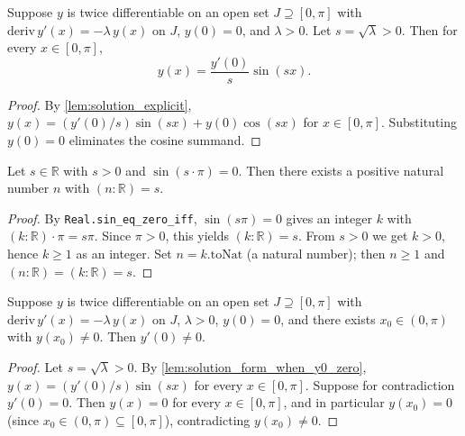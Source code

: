 \begin{lemma}[Solution form when $y(0) = 0$, $\lambda > 0$]
    \label{lem:solution_form_when_y0_zero}
    \leanok
    Suppose $y$ is twice differentiable on an open set $J \supseteq [0,\pi]$
    with $\mathrm{deriv}\, y'(x) = -\lambda \, y(x)$ on $J$, $y(0) = 0$, and
    $\lambda > 0$. Let $s = \sqrt{\lambda} > 0$. Then for every
    $x \in [0,\pi]$,
    \[ y(x) = \frac{y'(0)}{s} \sin(sx). \]
\end{lemma}
\begin{proof}
    By \cref{lem:solution_explicit}, $y(x) = (y'(0)/s)\sin(sx) + y(0)\cos(sx)$
    for $x \in [0,\pi]$. Substituting $y(0) = 0$ eliminates the cosine summand.
\end{proof}

\begin{lemma}[$s > 0$ and $\sin(s\pi) = 0$ force $s$ to be a positive natural]
    \label{lem:sin_pi_smul_eq_zero_pos_to_nat}
    \leanok
    Let $s \in \mathbb{R}$ with $s > 0$ and $\sin(s \cdot \pi) = 0$. Then there
    exists a positive natural number $n$ with $(n : \mathbb{R}) = s$.
\end{lemma}
\begin{proof}
    By \texttt{Real.sin\_eq\_zero\_iff}, $\sin(s\pi) = 0$ gives an integer $k$
    with $(k : \mathbb{R}) \cdot \pi = s \pi$. Since $\pi > 0$, this yields
    $(k : \mathbb{R}) = s$. From $s > 0$ we get $k > 0$, hence $k \ge 1$ as an
    integer. Set $n = k.\mathrm{toNat}$ (a natural number); then $n \ge 1$ and
    $(n : \mathbb{R}) = (k : \mathbb{R}) = s$.
\end{proof}

\begin{lemma}[Nontriviality forces $y'(0) \neq 0$ when $y(0) = 0$]
    \label{lem:yprime0_ne_zero_of_nontrivial}
    \leanok
    Suppose $y$ is twice differentiable on an open set $J \supseteq [0,\pi]$
    with $\mathrm{deriv}\, y'(x) = -\lambda \, y(x)$ on $J$, $\lambda > 0$,
    $y(0) = 0$, and there exists $x_0 \in (0,\pi)$ with $y(x_0) \neq 0$. Then
    $y'(0) \neq 0$.
\end{lemma}
\begin{proof}
    Let $s = \sqrt{\lambda} > 0$. By \cref{lem:solution_form_when_y0_zero},
    $y(x) = (y'(0)/s) \sin(sx)$ for every $x \in [0,\pi]$. Suppose for
    contradiction $y'(0) = 0$. Then $y(x) = 0$ for every $x \in [0,\pi]$, and
    in particular $y(x_0) = 0$ (since $x_0 \in (0,\pi) \subseteq [0,\pi]$),
    contradicting $y(x_0) \neq 0$.
\end{proof}


